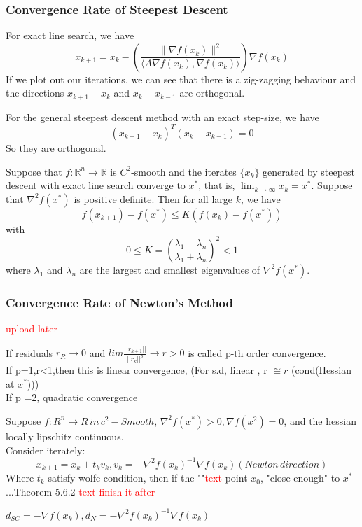 \subsubsection{Convergence Rate of Steepest Descent}
For exact line search, we have
$$x_{k+1} = x_k - \left(\frac{\| \nabla f(x_k)\|^2}{\langle A \nabla f(x_k), \nabla f(x_k) \rangle}\right) \nabla f(x_k)$$
If we plot out our iterations, we can see that there is a zig-zagging behaviour and the directions $x_{k+1} - x_k$ and $x_k - x_{k-1}$ are orthogonal.
\begin{theorem}
    For the general steepest descent method with an exact step-size, we have
    $$(x_{k+1} - x_k)^T (x_k - x_{k-1}) = 0$$
    So they are orthogonal.
\end{theorem}
\begin{theorem}
    Suppose that $f: \mathbb R^n \to \mathbb R$ is $C^2$-smooth and the iterates $\{x_k\}$ generated by steepest descent with exact line search converge to $x^*$, that is, $\lim_{k \to \infty} x_k = x^*$. Suppose that $\nabla^2 f(x^*)$ is positive definite. Then for all large $k$, we have
    $$f(x_{k+1}) - f(x^*) \leq K (f(x_k) - f(x^*))$$ with 
    $$0 \leq K = \left(\frac{\lambda_1 - \lambda_n}{\lambda_1 + \lambda_n}\right)^2 < 1$$
    where $\lambda_1$ and $\lambda_n$ are the largest and smallest eigenvalues of $\nabla^2 f(x^*)$. 
\end{theorem}

\subsubsection{Convergence Rate of Newton's Method}

\begin{definition}
    \textcolor{red}{upload later}
  \end{definition}
  
  \begin{definition}
      If residuals $r_R\to 0$ and 
      $lim\frac{||r_{k+1}||}{||r_k||^p}\to r >0$ is called p-th order convergence.
      \\ If p=1,r<1,then this is linear convergence, (For s.d, linear , r $\cong r$ (cond(Hessian at $x^*$)))
      \\ If p =2, quadratic convergence
  \end{definition}
  
  \begin{theorem}
      Suppose $f:R^n\to R\,in\, c^2-Smooth$, $\nabla^2f(x^*)>0,\nabla f(x^2)=0$, and 
      the hessian locally lipschitz continuous.\\
      Consider iterately:
      $$x_{k+1}=x_k+t_kv_k,v_k=-\nabla^2f(x_k)^{-1}\nabla f(x_k)(Newton\,direction)$$
      Where $t_k$ satisfy wolfe condition, then  if the ""\textcolor{red}{text} point $x_0$,
      "close enough" to $x^*$ ...Theorem 5.6.2 \textcolor{red}{text finish it after}
  \end{theorem}
  \begin{problem}
      $d_{SC}=-\nabla f(x_k),d_N=-\nabla^2f(x_k)^{-1}\nabla f(x_k) $
  \end{problem}
  
